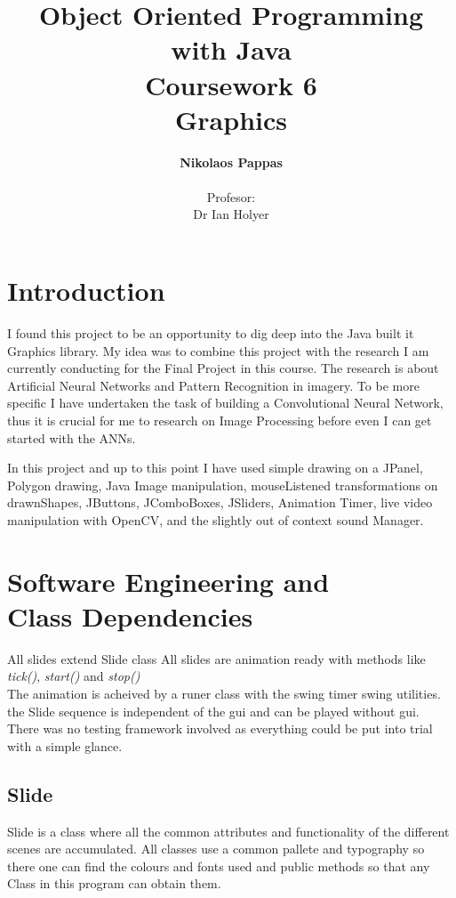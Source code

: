 \documentclass[a4paper, 11pt]{paper}
\author{\Large \textbf{Nikolaos Pappas}\\ \\Profesor: \\Dr Ian Holyer}
\title{\Huge Object Oriented Programming\\ with Java\\\vspace{1cm}\LARGE Coursework 6\\ \textbf{Graphics}}
\begin{document}
\thispagestyle{empty}
\maketitle
\newpage
\pagestyle{plain}
\section{Introduction}
\indent\par
I found this project to be an opportunity to dig deep into the Java
built it Graphics library. My idea was to combine this project with
the research I am currently conducting for the Final Project in this course.
The research is about Artificial Neural Networks and Pattern Recognition in imagery.
To be more specific I have undertaken the task of building a Convolutional Neural Network, thus
it is crucial for me to research on Image Processing before even I can get started with the ANNs.\\
\par
In this project and up to this point I have used simple drawing on a JPanel,
Polygon drawing, Java Image manipulation, mouseListened transformations on drawnShapes, JButtons, JComboBoxes, JSliders,
Animation Timer, live video manipulation with OpenCV, and the slightly out of context sound Manager.\\
\section{Software Engineering and \\Class Dependencies}
\indent\par
All slides extend Slide class
All slides are animation ready with methods like \textit{tick()}, \textit{start()} and \textit{stop()}\\
The animation is acheived by a runer class with the swing timer swing utilities.
the Slide sequence is independent of the gui and can be played without gui.
There was no testing framework involved as everything could be put into trial with a simple glance.
\subsection{Slide}
\indent\par
Slide is a class where all the common attributes and functionality of the different scenes are
accumulated. All classes use a common pallete and typography so there one can find the colours and fonts
used and public methods so that any Class in this program can obtain them.\\
\end{document}
